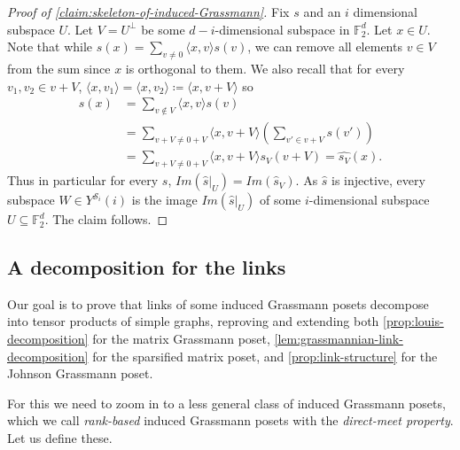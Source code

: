 \documentclass[10pt,a4paper]{article}
\newcommand{\prettyref}[1]{\cref{#1}}
\theoremstyle{definition}
\theoremstyle{remark}
\newcommand{\iprod}[1]{\langle#1\rangle}
\newcommand{\F}{\mathbb{F}}
\numberwithin{equation}{section}
\let\pref=\prettyref
\begin{document}
\begin{proof}[Proof of \pref{claim:skeleton-of-induced-Grassmann}]
    Fix \(s\) and an $i$ dimensional subspace \(U\). Let \(V=U^\bot\) be some \(d-i\)-dimensional subspace in \(\F_2^d\). Let \(x \in U\). Note that while \(\widehat{s}(x) = \sum_{v\ne 0} \iprod{x,v}s(v)\), we can remove all elements \(v \in V\) from the sum since \(x\) is orthogonal to them. We also recall that for every \(v_1,v_2 \in v+V\), \(\iprod{x,v_1} = \iprod{x,v_2} \coloneqq \iprod{x,v+V}\) so
    \begin{align*}
        \widehat{s}(x) &= \sum_{v\notin V} \iprod{x,v}s(v) \\
        &=\sum_{v+V \ne 0+V} \iprod{x,v+V} \left(\sum_{v' \in v+V}s(v') \right)\\
        &= \sum_{v+V \ne 0+ V}\iprod{x,v+V} s_V(v+V) = \widehat{s_V}(x).
    \end{align*}
    Thus in particular for every \(s\), \(Im(\widehat{s}|_U) = Im(\widehat{s}_V)\). As \(\widehat{s}\) is injective, every subspace \(W \in Y^{\mathcal{S}_i}(i)\) is the image \(Im(\widehat{s}|_U)\) of some \(i\)-dimensional subspace \(U \subseteq \F_2^d\). The claim follows.
\end{proof}

\subsection{A decomposition for the links}
Our goal is to prove that links of some induced Grassmann posets decompose into tensor products of simple graphs, reproving and extending both \pref{prop:louis-decomposition} for the matrix Grassmann poset, \pref{lem:grassmannian-link-decomposition} for the sparsified matrix poset, and \pref{prop:link-structure} for the Johnson Grassmann poset.

For this we need to zoom in to a less general class of induced Grassmann posets, which we call \emph{rank-based} induced Grassmann posets with the \emph{direct-meet property}. Let us define these.
\end{document}
